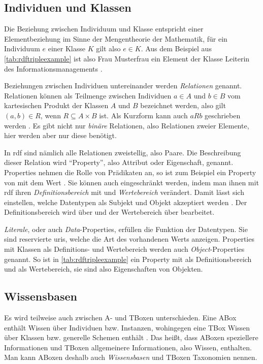 \subsection{Individuen und Klassen}
\label{sec:individuenundklassen}
Die Beziehung zwischen Individuum und Klasse entspricht einer Elementbeziehung im Sinne der Mengentheorie der Mathematik, für ein Individuum $e$ einer Klasse $K$ gilt also $e \in K$.
Aus dem Beispiel aus \cref{tab:rdftripleexample} ist also Frau Musterfrau ein Element der Klasse Leiterin des Informationsmanagements \citep[S.~261]{semanticwebgrundlagen}.

Beziehungen zwischen Individuen untereinander werden \emph{Relationen} genannt.
Relationen können als Teilmenge zwischen Individuen $a \in A$ und $b \in B$ vom kartesischen Produkt der Klassen $A$ und $B$ bezeichnet werden,
also gilt $(a,b) \in R$, wenn $R \subseteq A \times B$ ist.
Als Kurzform kann auch $aRb$ geschrieben werden \citep[S.~263]{semanticwebgrundlagen}.
Es gibt nicht nur \emph{binäre} Relationen, also Relationen zweier Elemente, hier werden aber nur diese benötigt.

In \ac{rdf} sind nämlich alle Relationen zweistellig, also Paare.
Die Beschreibung dieser Relation wird \enquote{Property}, also Attribut oder Eigenschaft, genannt.
Properties nehmen die Rolle von Prädikaten an, so ist zum Beispiel  ein Property von  mit dem Wert .
Sie können auch eingeschränkt werden, indem man ihnen mit \ac{rdf} ihren \emph{Definitionsbereich} mit und \emph{Wertebereich} verändert.
Damit lässt sich einstellen, welche Datentypen als Subjekt und Objekt akzeptiert werden \citep[S.~76]{semanticwebgrundlagen}.
Der Definitionsbereich wird über  und der Wertebereich über  bearbeitet.

\emph{Literale}, oder auch \emph{Data}-Properties, erfüllen die Funktion der Datentypen.
Sie sind reservierte \acp{uri}, welche die Art des vorhandenen Werts anzeigen.
Properties mit Klassen als Definitions- und Wertebereich werden auch \emph{Object}-Properties genannt.
So ist in \cref{tab:rdftripleexample}  ein Property mit  als Definitionsbereich und  als Wertebereich,
sie sind also Eigenschaften von Objekten.

\subsection{Wissensbasen}
Es wird teilweise auch zwischen A- und TBoxen unterschieden.
Eine ABox enthält Wissen über Individuen bzw. Instanzen, wohingegen eine TBox Wissen über Klassen bzw. generelle Schemen enthält \citep[S.~167]{semanticwebgrundlagen}.
Das heißt, dass ABoxen speziellere Informationen und TBoxen allgemeinere Informationen, also Wissen, enthalten.
Man kann ABoxen deshalb auch \emph{Wissensbasen} und TBoxen Taxonomien nennen.

